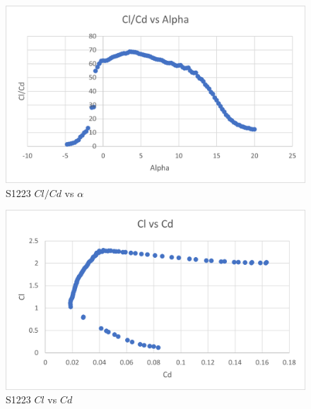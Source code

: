 \documentclass{article}
\begin{document}
\begin{figure}[!h]
\begin{center}
	\includegraphics[scale=0.7]{S1223 Efficiencyalpha.png}
	\caption{S1223 $Cl/Cd$ vs $\alpha$}
	\label{Figure8:}
\end{center}
\end{figure}

\begin{figure}[!h]
\begin{center}
	\includegraphics[scale=0.7]{S1223 ClCd.png}
	\caption{S1223 $Cl$ vs $Cd$}
	\label{Figure9:}
\end{center}
\end{figure}

\newpage
\end{document}
